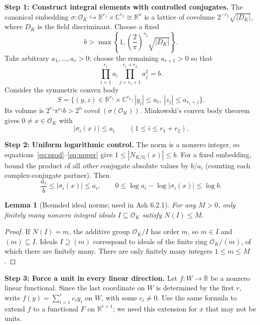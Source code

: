 \documentclass[11pt]{article}
\newtheorem{lemma}{Lemma}
\newcommand{\OK}{\mathcal O_K}
\newcommand{\R}{\mathbb R}
\newcommand{\Q}{\mathbb Q}
\newcommand{\C}{\mathbb C}
\newcommand{\Nm}{N_{K/\Q}}
\begin{document}
\medskip
\textbf{Step 1: Construct integral elements with controlled conjugates.}
The canonical embedding $\sigma:\OK\hookrightarrow\R^{r_1}\times\C^{r_2}\cong\R^n$ is a lattice of covolume $2^{-r_2}\sqrt{|D_K|}$, where $D_K$ is the field discriminant. Choose a fixed
\[
b>\max\left\{1,\left(\frac{2}{\pi}\right)^{r_2}\sqrt{|D_K|}\right\}.
\]
Take arbitrary $a_1,\ldots,a_r>0$; choose the remaining $a_{r+1}>0$ so that
\begin{equation}\label{eq:prod}
\prod_{i=1}^{r_1}a_i\prod_{j=r_1+1}^{r_1+r_2}a_j^2=b.
\end{equation}
Consider the symmetric convex body
\[
S=\bigl\{(y,z)\in\R^{r_1}\times\C^{r_2}:|y_i|\le a_i,\ |z_j|\le a_{r_1+j}\bigr\}.
\]
Its volume is $2^{r_1}\pi^{r_2}b>2^n\operatorname{covol}(\sigma(\OK))$. Minkowski's convex body theorem gives $0\ne x\in\OK$ with
\begin{equation}\label{eq:upper}
|\sigma_i(x)|\le a_i\qquad(1\le i\le r_1+r_2).
\end{equation}

\textbf{Step 2: Uniform logarithmic control.}
The norm is a nonzero integer, so equations~\eqref{eq:prod}--\eqref{eq:upper} give
$1\le|\Nm(x)|\le b$. For a fixed embedding, bound the product of all \emph{other} conjugate absolute values by $b/a_i$ (counting each complex-conjugate partner). Then
\begin{equation}\label{eq:bound}
\frac{a_i}{b}\le|\sigma_i(x)|\le a_i,
\qquad 0\le\log a_i-\log|\sigma_i(x)|\le\log b.
\end{equation}

\begin{lemma}[Bounded ideal norms; used in Ash 6.2.1]\label{lem:ideals}
For any $M>0$, only finitely many nonzero integral ideals $I\subseteq\OK$ satisfy $N(I)\le M$.
\end{lemma}
\begin{proof}
If $N(I)=m$, the additive group $\OK/I$ has order $m$, so $m\in I$ and $(m)\subseteq I$. Ideals $I\supseteq(m)$ correspond to ideals of the finite ring $\OK/(m)$, of which there are finitely many. There are only finitely many integers $1\le m\le M$.
\end{proof}

\textbf{Step 3: Force a unit in every linear direction.}
Let $f:W\to\R$ be a nonzero linear functional. Since the last coordinate on $W$ is determined by the first $r$, write $f(y)=\sum_{i=1}^r c_i y_i$ on $W$, with some $c_i\ne0$. Use the same formula to extend $f$ to a functional $F$ on $\R^{r+1}$; we need this extension for $x$ that may not be units.
\end{document}
